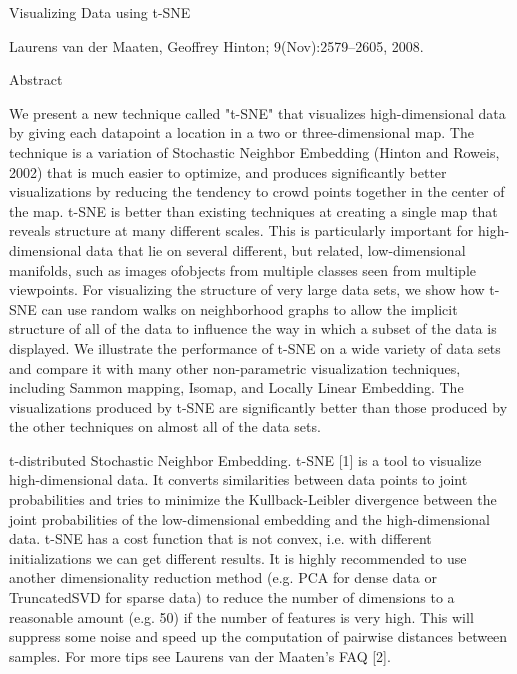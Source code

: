Visualizing Data using t-SNE

Laurens van der Maaten, Geoffrey Hinton; 9(Nov):2579--2605, 2008.

Abstract

We present a new technique called "t-SNE" that visualizes high-dimensional data by giving each datapoint a location in a two or three-dimensional map. The technique is a variation of Stochastic Neighbor Embedding (Hinton and Roweis, 2002) that is much easier to optimize, and produces significantly better visualizations by reducing the tendency to crowd points together in the center of the map. t-SNE is better than existing techniques at creating a single map that reveals structure at many different scales. This is particularly important for high-dimensional data that lie on several different, but related, low-dimensional manifolds, such as images ofobjects from multiple classes seen from multiple viewpoints. For visualizing the structure of very large data sets, we show how t-SNE can use random walks on neighborhood graphs to allow the implicit structure of all of the data to influence the way in which a subset of the data is displayed. We illustrate the performance of t-SNE on a wide variety of data sets and compare it with many other non-parametric visualization techniques, including Sammon mapping, Isomap, and Locally Linear Embedding. The visualizations produced by t-SNE are significantly 
better than those produced by the other techniques on almost all of the data sets.

%

t-distributed Stochastic Neighbor Embedding.
t-SNE [1] is a tool to visualize high-dimensional data. It converts similarities between data points to joint probabilities and tries to minimize the Kullback-Leibler divergence between the joint probabilities of the low-dimensional embedding and the high-dimensional data. t-SNE has a cost function that is not convex, i.e. with different initializations we can get different results.
It is highly recommended to use another dimensionality reduction method (e.g. PCA for dense data or TruncatedSVD for sparse data) to reduce the number of dimensions to a reasonable amount (e.g. 50) if the number of features is very high. This will suppress some noise and speed up the computation of pairwise distances between samples. For more tips see Laurens van der Maaten’s FAQ [2].

